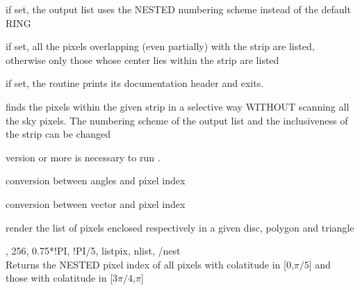 \begin{keywords}
  \begin{kwlist}{} %
    \item[NESTED =] if set, the output list uses the NESTED numbering scheme
    instead of the default RING
    \item[INCLUSIVE = ] if set, all the pixels overlapping (even partially)
                   with the strip are listed, otherwise only those whose
                   center lies within the strip are listed
    \item[/HELP ] if set, the routine prints its documentation header and exits.
  \end{kwlist}
\end{keywords}  

\begin{codedescription}
{\facname finds the pixels within the given strip in a selective way WITHOUT
scanning all the sky pixels. The numbering scheme of the output list and the
inclusiveness of the strip can be changed}
\end{codedescription}



\begin{related}
  \begin{sulist}{} %
    \item[idl] version \idlversion or more is necessary to run \facname.
    \item[ang2pix, pix2ang] conversion between angles and pixel index
    \item[vec2pix, pix2vec] conversion between vector and pixel index
    \item[\htmlref{query\_disc}{idl:query_disc}, \htmlref{query\_polygon}{idl:query_polygon},]
    \item[\htmlref{query\_triangle}{idl:query_triangle}] render the list of pixels enclosed
  respectively in a given disc, polygon and triangle
  \end{sulist}
\end{related}

\begin{example}
{
\facname,  256, 0.75*!PI, !PI/5, listpix, nlist, /nest  \\
}
{
Returns the NESTED pixel index of all pixels with colatitude in
[0,$\pi/5$] and those with colatitude in [$3\pi/4$,$\pi$]
}
\end{example}


